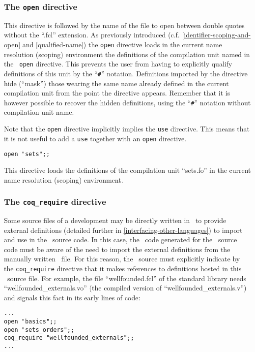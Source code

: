 \subsubsection{The {\tt open} directive}

This directive is followed by the name of the file to open between
double quotes without the ``.fcl'' extension. As previously introduced
(c.f. \ref{identifier-scoping-and-open} and \ref{qualified-name}) the
{\tt open} directive loads in the current name resolution (scoping)
environment the definitions of the compilation unit named in the {\tt
  open} directive. This prevents the user from having to explicitly
qualify definitions of this unit by the ``{\tt\#}''
notation. Definitions imported by the directive hide (``mask'') those
wearing the same name already defined in the current compilation unit
from the point the directive appears. Remember that it is however
possible to recover the hidden definitions, using the ``{\tt\#}''
notation without compilation unit name.

Note that the {\tt open} directive implicitly implies the {\tt use}
directive. This means that it is not useful to add a {\tt use}
together with an {\tt open} directive.

{\scriptsize
\begin{lstlisting}
open "sets";;
\end{lstlisting}
}This directive loads the definitions of the compilation unit
``sets.fo'' in the current name resolution (scoping) environment.




\subsubsection{The {\tt coq\_require} directive}
Some source files of a development may be directly written in \coq\ to
provide external definitions (detailed further in
\ref{interfacing-other-languages}) to import and use in the %
\focal\ source code. In this case, the \coq\ code generated for the
\focal\ source code must be aware of the need to import the external
definitions from the manually written \coq\ file. For this reason, the
\focal\ source must explicitly indicate by the {\tt coq\_require}
directive that it makes references to definitions hosted in this
\coq\ source file. For example, the file ``wellfounded.fcl'' of the
standard library needs ``wellfounded\_externals.vo'' (the compiled version of
``wellfounded\_externals.v'') and signals this
fact in its early lines of code:
{\scriptsize
\begin{lstlisting}
...
open "basics";;
open "sets_orders";;
coq_require "wellfounded_externals";;
...
\end{lstlisting}
}



